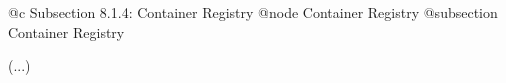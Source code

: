 @c Subsection 8.1.4: Container Registry
@node Container Registry
@subsection Container Registry

(...)

